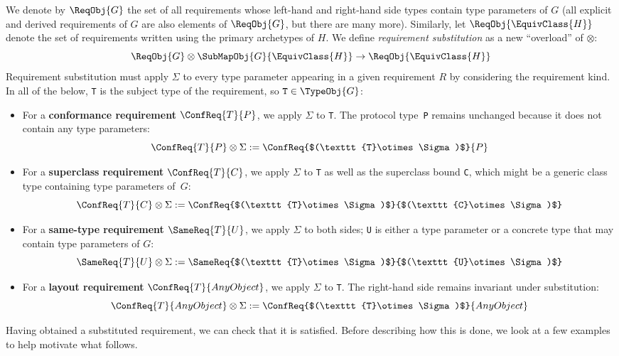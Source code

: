 \documentclass[../generics]{subfiles}
\begin{document}
\begin{definition}
We denote by $\ReqObj{G}$ the set of all requirements whose left-hand and right-hand side types contain type parameters of $G$ (all explicit and derived requirements of $G$ are also elements of $\ReqObj{G}$, but there are many more). Similarly, let $\ReqObj{\EquivClass{H}}$ denote the set of requirements written using the primary archetypes of $H$. We define \emph{requirement substitution} as a new ``overload'' of \index{$\otimes$}$\otimes$:
\[\ReqObj{G}\otimes\SubMapObj{G}{\EquivClass{H}}\rightarrow\ReqObj{\EquivClass{H}}\]
Requirement substitution must apply $\Sigma$ to every type parameter appearing in a given requirement $R$ by considering the requirement kind. In all of the below, \texttt{T} is the subject type of the requirement, so $\texttt{T}\in\TypeObj{G}$:
\begin{itemize}
\item For a \textbf{conformance requirement} $\ConfReq{T}{P}$, we apply $\Sigma$ to \texttt{T}. The protocol type~\texttt{P} remains unchanged because it does not contain any type parameters:
\[\ConfReq{T}{P}\otimes\Sigma:=\ConfReq{$(\texttt{T}\otimes\Sigma)$}{P}\]

\item For a \textbf{superclass requirement} $\ConfReq{T}{C}$, we apply $\Sigma$ to \texttt{T} as well as the superclass bound \texttt{C}, which might be a generic class type containing type parameters of~$G$:
\[\ConfReq{T}{C}\otimes\Sigma:=\ConfReq{$(\texttt{T}\otimes\Sigma)$}{$(\texttt{C}\otimes\Sigma)$}\]

\item For a \textbf{same-type requirement} $\SameReq{T}{U}$, we apply $\Sigma$ to both sides; \texttt{U} is either a type parameter or a concrete type that may contain type parameters of $G$:
\[\SameReq{T}{U}\otimes\Sigma:=\SameReq{$(\texttt{T}\otimes\Sigma)$}{$(\texttt{U}\otimes\Sigma)$}\]

\item For a \textbf{layout requirement} $\ConfReq{T}{AnyObject}$, we apply $\Sigma$ to \texttt{T}. The right-hand side remains invariant under substitution:
\[\ConfReq{T}{AnyObject}\otimes\Sigma:=\ConfReq{$(\texttt{T}\otimes\Sigma)$}{AnyObject}\]
\end{itemize}
Having obtained a substituted requirement, we can check that it is satisfied. Before describing how this is done, we look at a few examples to help motivate what follows.
\end{definition}
\end{document}
